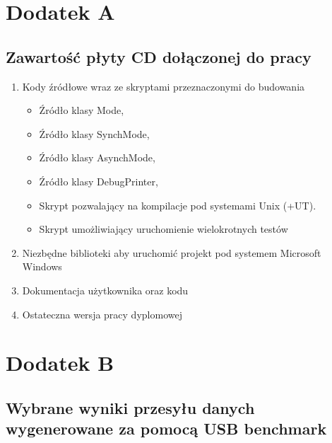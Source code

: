 \documentclass{BscUS}
\newcommand\blankpage{%
    \null
    \thispagestyle{empty}%
    \newpage}
\begin{document}
\newpage
\pagestyle{empty}
\appendix
\chapter*{Dodatek A} \label{App:AppendixA}
\section*{Zawartość płyty CD dołączonej do pracy}

\begin{enumerate}
\item Kody źródłowe wraz ze skryptami przeznaczonymi do budowania
\begin{itemize}
\item Źródło klasy Mode,
\item Źródło klasy SynchMode,
\item Źródło klasy AsynchMode,
\item Źródło klasy DebugPrinter,
\item Skrypt pozwalający na kompilacje pod systemami Unix (+UT).
\item Skrypt umożliwiający uruchomienie wielokrotnych testów
\end{itemize}
\item Niezbędne biblioteki aby uruchomić projekt pod systemem Microsoft Windows
\item Dokumentacja użytkownika oraz kodu
\item Ostateczna wersja pracy dyplomowej
\end{enumerate}


\newpage
\afterpage{\blankpage}

\chapter*{Dodatek B} \label{App:AppendixB}
\section*{Wybrane wyniki przesyłu danych wygenerowane za pomocą USB benchmark}

\newpage
\afterpage{\blankpage}
\end{document}
